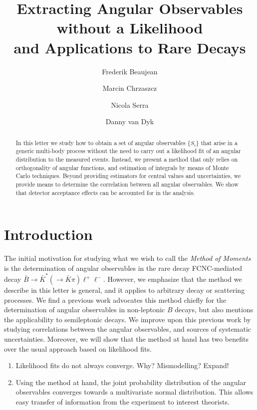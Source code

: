 \documentclass[aps,prd,reprint,nofootinbib,preprintnumbers]{revtex4}
\newcommand{\fred}[1]{{\color{brown!85!black}#1}}
\begin{document}
\allowdisplaybreaks

\title{Extracting Angular Observables without a Likelihood\\and Applications to Rare Decays}
\author{Frederik Beaujean}
\author{Marcin Chrzaszcz}
\author{Nicola Serra}
\author{Danny van Dyk}

\begin{abstract}
In this letter we study how to obtain a set of angular observables
$\{S_i\}$ that arise in a generic multi-body process without the need
to carry out a likelihood fit of an angular distribution to the
measured events. Instead, we present a method that only relies on
orthogonality of angular functions, and estimation of integrals
by means of Monte Carlo techniques. Beyond providing estimators
for central values and uncertainties, we provide means to determine
the correlation between all angular observables. We show that detector
acceptance effects can be accounted for in the analysis.
\end{abstract}

\maketitle

\section{Introduction}
\label{sec:intro}

The initial motivation for studying what we wish to call the \emph{Method of Moments}
is the determination of angular observables in the rare decay FCNC-mediated decay
$\bar{B}\to \bar{K}^*(\to \bar{K}\pi)\ell^+\ell^-$. However, we emphasize that
the method we describe in this letter is general, and it applies to arbitrary
decay or scattering processes. We find a previous work \cite{Dighe:1998vk}
advocates this method chiefly for the determination of angular observables in non-leptonic
$B$ decays, but also mentions the applicability to semileptonic decays. We improve
upon this previous work by studying correlations between the angular observables,
and sources of systematic uncertainties. Moreover, we will show that the method
at hand has two benefits over the usual approach based on likelihood fits.
\begin{enumerate}
    \item Likelihood fits do not always converge. \fred{Why? Mismodelling? Expand!}
    \item Using the method at hand, the joint probability distribution of the
        angular observables converges towards a multivariate normal distribution.
        This allows easy transfer of information from the experiment to interest
        theorists.
\end{enumerate}
\end{document}
